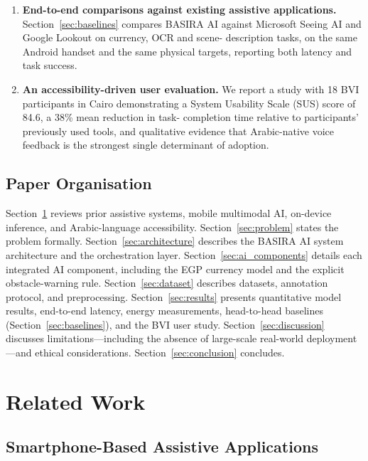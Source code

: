 \documentclass[11pt,a4paper]{article}
\begin{document}
\begin{enumerate}
\item \textbf{End-to-end comparisons against existing assistive
applications.} Section~\ref{sec:baselines} compares BASIRA AI against
Microsoft Seeing AI and Google Lookout on currency, OCR and scene-
description tasks, on the same Android handset and the same physical
targets, reporting both latency and task success.

\item \textbf{An accessibility-driven user evaluation.} We report a
study with 18 BVI participants in Cairo demonstrating a System
Usability Scale (SUS) score of 84.6, a 38\% mean reduction in task-
completion time relative to participants' previously used tools, and
qualitative evidence that Arabic-native voice feedback is the strongest
single determinant of adoption.
\end{enumerate}

\subsection{Paper Organisation}

Section~\ref{sec:related_work} reviews prior assistive systems, mobile
multimodal AI, on-device inference, and Arabic-language accessibility.
Section~\ref{sec:problem} states the problem formally.
Section~\ref{sec:architecture} describes the BASIRA AI system architecture
and the orchestration layer.
Section~\ref{sec:ai_components} details each integrated AI component,
including the EGP currency model and the explicit obstacle-warning rule.
Section~\ref{sec:dataset} describes datasets, annotation protocol, and
preprocessing.
Section~\ref{sec:results} presents quantitative model results, end-to-end
latency, energy measurements, head-to-head baselines
(Section~\ref{sec:baselines}), and the BVI user study.
Section~\ref{sec:discussion} discusses limitations---including the
absence of large-scale real-world deployment---and ethical
considerations.
Section~\ref{sec:conclusion} concludes.

\section{Related Work}
\label{sec:related_work}

\subsection{Smartphone-Based Assistive Applications}
\end{document}
